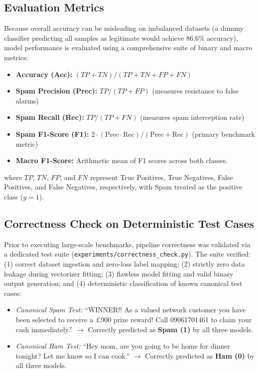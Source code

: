 \documentclass[conference]{IEEEtran}
\begin{document}
\subsection{Evaluation Metrics}
Because overall accuracy can be misleading on imbalanced datasets (a dummy classifier predicting all samples as legitimate would achieve $86.6\%$ accuracy), model performance is evaluated using a comprehensive suite of binary and macro metrics:
\begin{itemize}
    \item \textbf{Accuracy (Acc):} $(TP + TN) / (TP + TN + FP + FN)$
    \item \textbf{Spam Precision (Prec):} $TP / (TP + FP)$ (measures resistance to false alarms)
    \item \textbf{Spam Recall (Rec):} $TP / (TP + FN)$ (measures spam interception rate)
    \item \textbf{Spam F1-Score (F1):} $2 \cdot (\text{Prec} \cdot \text{Rec}) / (\text{Prec} + \text{Rec})$ (primary benchmark metric)
    \item \textbf{Macro F1-Score:} Arithmetic mean of F1 scores across both classes.
\end{itemize}
where $TP$, $TN$, $FP$, and $FN$ represent True Positives, True Negatives, False Positives, and False Negatives, respectively, with Spam treated as the positive class ($y = 1$).

\subsection{Correctness Check on Deterministic Test Cases}
Prior to executing large-scale benchmarks, pipeline correctness was validated via a dedicated test suite (\texttt{experiments/correctness\_check.py}). The suite verified: (1) correct dataset ingestion and zero-loss label mapping; (2) strictly zero data leakage during vectorizer fitting; (3) flawless model fitting and valid binary output generation; and (4) deterministic classification of known canonical test cases:
\begin{itemize}
    \item \textit{Canonical Spam Test:} ``WINNER!! As a valued network customer you have been selected to receive a \pounds 900 prize reward! Call 09061701461 to claim your cash immediately.'' $\to$ Correctly predicted as \textbf{Spam (1)} by all three models.
    \item \textit{Canonical Ham Test:} ``Hey mom, are you going to be home for dinner tonight? Let me know so I can cook.'' $\to$ Correctly predicted as \textbf{Ham (0)} by all three models.
\end{itemize}
\end{document}
